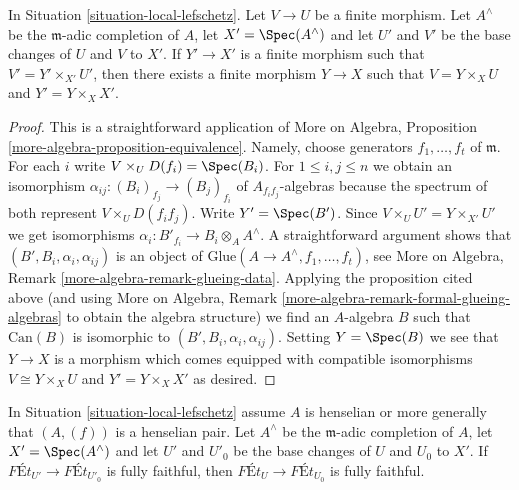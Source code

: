 \begin{lemma}
\label{lemma-fill-in-missing}
In Situation \ref{situation-local-lefschetz}. Let $V \to U$ be a finite
morphism.  Let $A^\wedge$ be the $\mathfrak m$-adic completion of $A$,
let $X' = \Spec(A^\wedge)$ and let $U'$ and $V'$ be the base changes of
$U$ and $V$ to $X'$. If $Y' \to X'$ is a finite morphism such that
$V' = Y' \times_{X'} U'$, then there exists a finite morphism $Y \to X$
such that $V = Y \times_X U$ and $Y' = Y \times_X X'$.
\end{lemma}

\begin{proof}
This is a straightforward application of
More on Algebra, Proposition \ref{more-algebra-proposition-equivalence}.
Namely, choose generators $f_1, \ldots, f_t$ of $\mathfrak m$.
For each $i$ write $V \times_U D(f_i) = \Spec(B_i)$.
For $1 \leq i, j \leq n$ we obtain an isomorphism
$\alpha_{ij} : (B_i)_{f_j} \to (B_j)_{f_i}$ of $A_{f_if_j}$-algebras
because the spectrum of both represent $V \times_U D(f_if_j)$.
Write $Y' = \Spec(B')$. Since $V \times_U U' = Y \times_{X'} U'$
we get isomorphisms $\alpha_i : B'_{f_i} \to B_i \otimes_A A^\wedge$.
A straightforward argument shows that $(B', B_i, \alpha_i, \alpha_{ij})$
is an object of $\text{Glue}(A \to A^\wedge, f_1, \ldots, f_t)$, see
More on Algebra, Remark \ref{more-algebra-remark-glueing-data}.
Applying the proposition cited above (and using
More on Algebra, Remark \ref{more-algebra-remark-formal-glueing-algebras}
to obtain the algebra structure) we find an $A$-algebra $B$ such that
$\text{Can}(B)$ is isomorphic to $(B', B_i, \alpha_i, \alpha_{ij})$.
Setting $Y = \Spec(B)$ we see that $Y \to X$ is a morphism
which comes equipped with compatible isomorphisms
$V \cong Y \times_X U$ and $Y' = Y \times_X X'$ as desired.
\end{proof}

\begin{lemma}
\label{lemma-fully-faithful-henselian-completion}
In Situation \ref{situation-local-lefschetz} assume $A$ is henselian
or more generally that $(A, (f))$ is a henselian pair.
Let $A^\wedge$ be the $\mathfrak m$-adic completion of $A$,
let $X' = \Spec(A^\wedge)$ and let $U'$ and $U'_0$ be the base changes of
$U$ and $U_0$ to $X'$. If $\textit{F\'Et}_{U'} \to \textit{F\'Et}_{U'_0}$
is fully faithful, then $\textit{F\'Et}_U \to \textit{F\'Et}_{U_0}$
is fully faithful.
\end{lemma}

